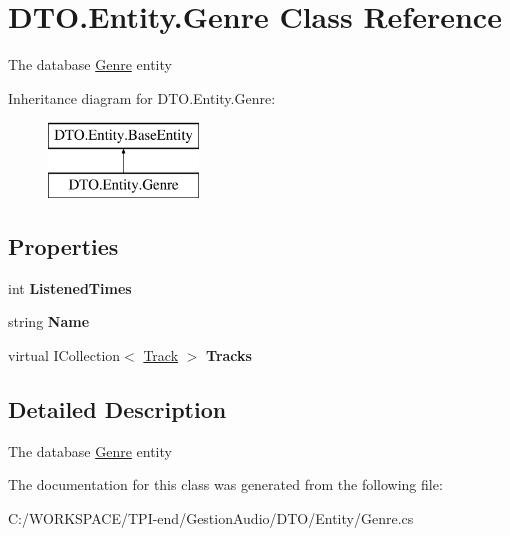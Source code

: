 \hypertarget{class_d_t_o_1_1_entity_1_1_genre}{}\section{D\+T\+O.\+Entity.\+Genre Class Reference}
\label{class_d_t_o_1_1_entity_1_1_genre}


The database \hyperlink{class_d_t_o_1_1_entity_1_1_genre}{Genre} entity  


Inheritance diagram for D\+T\+O.\+Entity.\+Genre\+:\begin{figure}[H]
\begin{center}
\leavevmode
\includegraphics[height=2.000000cm]{class_d_t_o_1_1_entity_1_1_genre}
\end{center}
\end{figure}
\subsection*{Properties}
\begin{DoxyCompactItemize}
\item 
\mbox{\label{class_d_t_o_1_1_entity_1_1_genre_a11a7f942944499fd58d55d3e9efe2407}} 
int {\bfseries Listened\+Times}
\item 
\mbox{\label{class_d_t_o_1_1_entity_1_1_genre_a62c9a9e23570e2eeb8c7df13085cd9ff}} 
string {\bfseries Name}
\item 
\mbox{\label{class_d_t_o_1_1_entity_1_1_genre_a5be3ef9a7c0a7c002041a91262055690}} 
virtual I\+Collection$<$ \hyperlink{class_d_t_o_1_1_entity_1_1_track}{Track} $>$ {\bfseries Tracks}
\end{DoxyCompactItemize}


\subsection{Detailed Description}
The database \hyperlink{class_d_t_o_1_1_entity_1_1_genre}{Genre} entity 



The documentation for this class was generated from the following file\+:\begin{DoxyCompactItemize}
\item 
C\+:/\+W\+O\+R\+K\+S\+P\+A\+C\+E/\+T\+P\+I-\/end/\+Gestion\+Audio/\+D\+T\+O/\+Entity/Genre.\+cs\end{DoxyCompactItemize}
